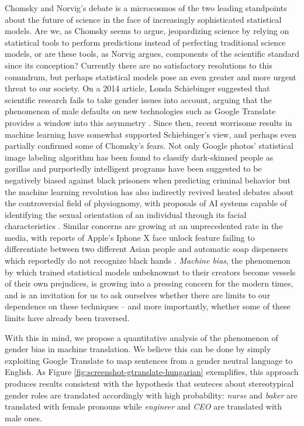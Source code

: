 \documentclass{article}
\begin{document}
Chomsky and Norvig's debate \cite{norvig2017chomsky} is a microcosmos of the two leading standpoints about the future of science in the face of increasingly sophisticated statistical models. Are we, as Chomsky seems to argue, jeopardizing science by relying on statistical tools to perform predictions instead of perfecting traditional science models, or are these tools, as Norvig argues, components of the scientific standard since its conception? Currently there are no satisfactory resolutions to this conundrum, but perhaps statistical models pose an even greater and more urgent threat to our society. On a 2014 article, Londa Schiebinger suggested that scientific research fails to take gender issues into account, arguing that the phenomenon of male defaults on new technologies such as Google Translate provides a window into this asymmetry \cite{schiebinger2014scientific}. Since then, recent worrisome results in machine learning have somewhat supported Schiebinger's view, and perhaps even partially confirmed some of Chomsky's fears. Not only Google photos' statistical image labeling algorithm has been found to classify dark-skinned people as gorillas \cite{garcia2016racist} and purportedly intelligent programs have been suggested to be negatively biased against black prisoners when predicting criminal behavior \cite{angwin2016machine} but the machine learning revolution has also indirectly revived heated debates about the controversial field of physiognomy, with proposals of AI systems capable of identifying the sexual orientation of an individual through its facial characteristics \cite{wang2017deep}. Similar concerns are growing at an unprecedented rate in the media, with reports of Apple's Iphone X face unlock feature failing to differentiate between two different Asian people \cite{womanunlockphone2017} and automatic soap dispensers which reportedly do not recognize black hands \cite{racistsoapdispenser2017}. \emph{Machine bias}, the phenomenon by which trained statistical models unbeknownst to their creators become vessels of their own prejudices, is growing into a pressing concern for the modern times, and is an invitation for us to ask ourselves whether there are limits to our dependence on these techniques -- and more importantly, whether some of these limits have already been traversed.

With this in mind, we propose a quantitative analysis of the phenomenon of gender bias in machine translation. We believe this can be done by simply exploiting Google Translate to map sentences from a gender neutral language to English. As Figure \ref{fig:screenshot-gtranslate-hungarian} exemplifies, this approach produces results consistent with the hypothesis that senteces about stereotypical gender roles are translated accordingly with high probability: \emph{nurse} and \emph{baker} are translated with female pronouns while \emph{engineer} and \emph{CEO} are translated with male ones.
\end{document}
